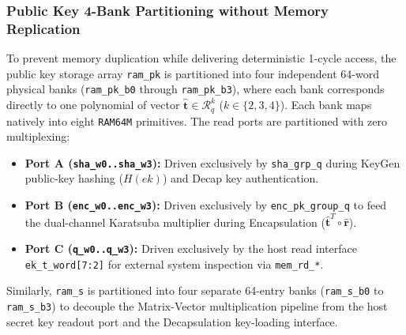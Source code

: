 \subsubsection{Public Key 4-Bank Partitioning without Memory Replication}
To prevent memory duplication while delivering deterministic 1-cycle access, the public key storage array \texttt{ram\_pk} is partitioned into four independent 64-word physical banks (\texttt{ram\_pk\_b0} through \texttt{ram\_pk\_b3}), where each bank corresponds directly to one polynomial of vector $\hat{\mathbf{t}} \in \mathcal{R}_q^k$ ($k \in \{2, 3, 4\}$). Each bank maps natively into eight \texttt{RAM64M} primitives. The read ports are partitioned with zero multiplexing:
\begin{itemize}
    \item \textbf{Port A (\texttt{sha\_w0..sha\_w3}):} Driven exclusively by \texttt{sha\_grp\_q} during KeyGen public-key hashing ($H(ek)$) and Decap key authentication.
    \item \textbf{Port B (\texttt{enc\_w0..enc\_w3}):} Driven exclusively by \texttt{enc\_pk\_group\_q} to feed the dual-channel Karatsuba multiplier during Encapsulation ($\hat{\mathbf{t}}^T \circ \hat{\mathbf{r}}$).
    \item \textbf{Port C (\texttt{q\_w0..q\_w3}):} Driven exclusively by the host read interface \texttt{ek\_t\_word[7:2]} for external system inspection via \texttt{mem\_rd\_*}.
\end{itemize}

Similarly, \texttt{ram\_s} is partitioned into four separate 64-entry banks (\texttt{ram\_s\_b0} to \texttt{ram\_s\_b3}) to decouple the Matrix-Vector multiplication pipeline from the host secret key readout port and the Decapsulation key-loading interface.

